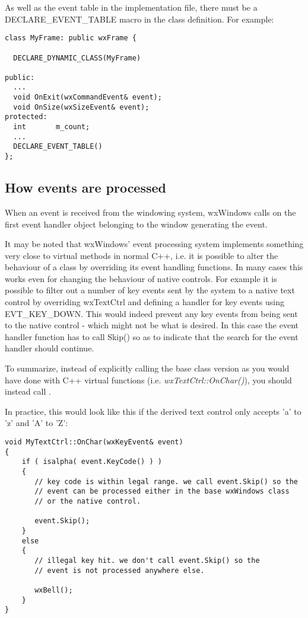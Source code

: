 As well as the event table in the implementation file, there must be a DECLARE\_EVENT\_TABLE
macro in the class definition. For example:

{\small%
\begin{verbatim}
class MyFrame: public wxFrame {

  DECLARE_DYNAMIC_CLASS(MyFrame)

public:
  ...
  void OnExit(wxCommandEvent& event);
  void OnSize(wxSizeEvent& event);
protected:
  int       m_count;
  ...
  DECLARE_EVENT_TABLE()
};
\end{verbatim}
}%

\subsection{How events are processed}\label{eventprocessing}

When an event is received from the windowing system, wxWindows calls  on
the first event handler object belonging to the window generating the event.

It may be noted that wxWindows' event processing system implements something
very close to virtual methods in normal C++, i.e. it is possible to alter
the behaviour of a class by overriding its event handling functions. In
many cases this works even for changing the behaviour of native controls.
For example it is possible to filter out a number of key events sent by the
system to a native text control by overriding wxTextCtrl and defining a
handler for key events using EVT\_KEY\_DOWN. This would indeed prevent
any key events from being sent to the native control - which might not be
what is desired. In this case the event handler function has to call Skip()
so as to indicate that the search for the event handler should continue.

To summarize, instead of explicitly calling the base class version as you
would have done with C++ virtual functions (i.e. {\it wxTextCtrl::OnChar()}),
you should instead call .

In practice, this would look like this if the derived text control only
accepts 'a' to 'z' and 'A' to 'Z':

{\small%
\begin{verbatim}
void MyTextCtrl::OnChar(wxKeyEvent& event)
{
    if ( isalpha( event.KeyCode() ) )
    {
       // key code is within legal range. we call event.Skip() so the
       // event can be processed either in the base wxWindows class
       // or the native control.
       
       event.Skip(); 
    }
    else
    {
       // illegal key hit. we don't call event.Skip() so the
       // event is not processed anywhere else.
       
       wxBell();
    }
}
\end{verbatim}
}%


